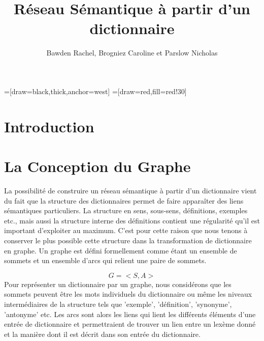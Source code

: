\documentclass{article}
\title{Réseau Sémantique à partir d'un dictionnaire}
\author{Bawden Rachel, Brogniez Caroline et Parslow Nicholas}
\date{}
\begin{document}
=[draw=black,thick,anchor=west]
=[draw=red,fill=red!30]

\maketitle

\section{Introduction}


\section{La Conception du Graphe}

La possibilité de construire un réseau sémantique à partir d'un dictionnaire vient du fait que la structure des dictionnaires permet de faire apparaîter des liens sémantiques particuliers. La structure en sens, sous-sens, définitions, exemples etc., mais aussi la structure interne des définitions contient une régularité qu'il est important d'exploiter au maximum. C'est pour cette raison que nous tenons à conserver le plus possible cette structure dans la transformation de dictionnaire en graphe. Un graphe est défini formellement comme étant un ensemble de sommets et un ensemble d'arcs qui relient une paire de sommets.

\[
G = <S, A>
\]
\newline
Pour représenter un dictionnaire par un graphe, nous considérons que les sommets peuvent être les mots individuels du dictionnaire ou même les niveaux intermédiaires de la structure tels que  'exemple', 'définition', 'synonyme', 'antonyme' etc. Les arcs sont alors les liens qui lient les différents éléments d'une entrée de dictionnaire et permettraient de trouver un lien entre un lexème donné et la manière dont il est décrit dans son entrée du dictionnaire.
\end{document}
